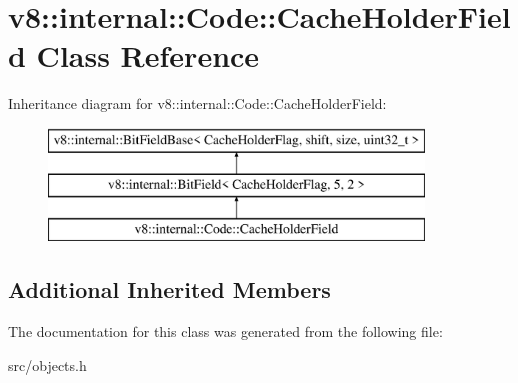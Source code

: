 \hypertarget{classv8_1_1internal_1_1_code_1_1_cache_holder_field}{}\section{v8\+:\+:internal\+:\+:Code\+:\+:Cache\+Holder\+Field Class Reference}
\label{classv8_1_1internal_1_1_code_1_1_cache_holder_field}
Inheritance diagram for v8\+:\+:internal\+:\+:Code\+:\+:Cache\+Holder\+Field\+:\begin{figure}[H]
\begin{center}
\leavevmode
\includegraphics[height=3.000000cm]{classv8_1_1internal_1_1_code_1_1_cache_holder_field}
\end{center}
\end{figure}
\subsection*{Additional Inherited Members}


The documentation for this class was generated from the following file\+:\begin{DoxyCompactItemize}
\item 
src/objects.\+h\end{DoxyCompactItemize}
